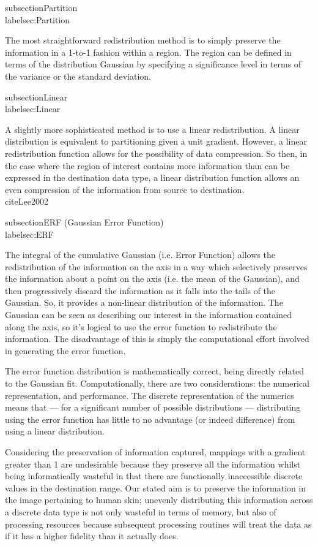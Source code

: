 subsection{Partition}\\label{sec:Partition}

The most straightforward redistribution method is to simply preserve the information in a 1-to-1 fashion within a region. The region can be defined in terms of the distribution Gaussian by specifying a significance level in terms of the variance or the standard deviation.

subsection{Linear}\\label{sec:Linear}

A slightly more sophisticated method is to use a linear redistribution. A linear distribution is equivalent to partitioning given a unit gradient. However, a linear redistribution function allows for the possibility of data compression. So then, in the case where the region of interest contains more information than can be expressed in the destination data type, a linear distribution function allows an even compression of the information from source to destination. ~\\cite{Lee2002}

subsection{ERF (Gaussian Error Function)}\\label{sec:ERF}

The integral of the cumulative Gaussian (i.e. Error Function) allows the redistribution of the information on the axis in a way which selectively preserves the information about a point on the axis (i.e. the mean of the Gaussian), and then progressively discard the information as it falls into the tails of the Gaussian. So, it provides a non-linear distribution of the information. The Gaussian can be seen as describing our interest in the information contained along the axis, so it's logical to use the error function to redistribute the information. The disadvantage of this is simply the computational effort involved in generating the error function.

The error function distribution is mathematically correct, being directly related to the Gaussian fit. Computationally, there are two considerations: the numerical representation, and performance. The discrete representation of the numerics means that --- for a significant number of possible distributions --- distributing using the error function has little to no advantage (or indeed difference) from using a linear distribution.

Considering the preservation of information captured, mappings with a gradient greater than 1 are undesirable because they preserve all the information whilst being informatically wasteful in that there are functionally inaccessible discrete values in the destination range. Our stated aim is to preserve the information in the image pertaining to human skin; unevenly distributing this information across a discrete data type is not only wasteful in terms of memory, but also of processing resources because subsequent processing routines will treat the data as if it has a higher fidelity than it actually does.

